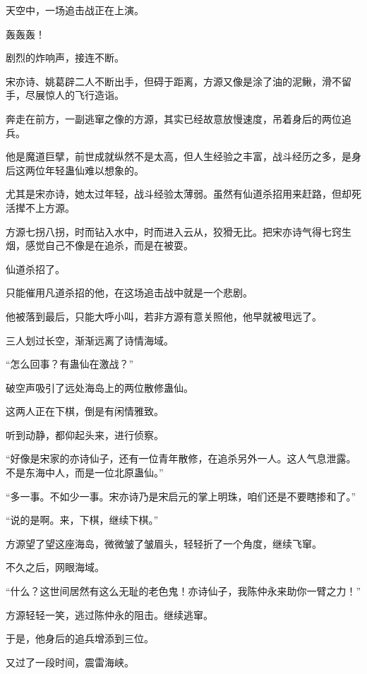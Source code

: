 
\begin{this_body}



天空中，一场追击战正在上演。

轰轰轰！

剧烈的炸响声，接连不断。

宋亦诗、姚葛辟二人不断出手，但碍于距离，方源又像是涂了油的泥鳅，滑不留手，尽展惊人的飞行造诣。

奔走在前方，一副逃窜之像的方源，其实已经故意放慢速度，吊着身后的两位追兵。

他是魔道巨擘，前世成就纵然不是太高，但人生经验之丰富，战斗经历之多，是身后这两位年轻蛊仙难以想象的。

尤其是宋亦诗，她太过年轻，战斗经验太薄弱。虽然有仙道杀招用来赶路，但却死活撵不上方源。

方源七拐八拐，时而钻入水中，时而进入云从，狡猾无比。把宋亦诗气得七窍生烟，感觉自己不像是在追杀，而是在被耍。

仙道杀招了。

只能催用凡道杀招的他，在这场追击战中就是一个悲剧。

他被落到最后，只能大呼小叫，若非方源有意关照他，他早就被甩远了。

三人划过长空，渐渐远离了诗情海域。

“怎么回事？有蛊仙在激战？”

破空声吸引了远处海岛上的两位散修蛊仙。

这两人正在下棋，倒是有闲情雅致。

听到动静，都仰起头来，进行侦察。

“好像是宋家的亦诗仙子，还有一位青年散修，在追杀另外一人。这人气息泄露。不是东海中人，而是一位北原蛊仙。”

“多一事。不如少一事。宋亦诗乃是宋启元的掌上明珠，咱们还是不要瞎掺和了。”

“说的是啊。来，下棋，继续下棋。”

方源望了望这座海岛，微微皱了皱眉头，轻轻折了一个角度，继续飞窜。

不久之后，网眼海域。

“什么？这世间居然有这么无耻的老色鬼！亦诗仙子，我陈仲永来助你一臂之力！”

方源轻轻一笑，逃过陈仲永的阻击。继续逃窜。

于是，他身后的追兵增添到三位。

又过了一段时间，震雷海峡。


\end{this_body}
